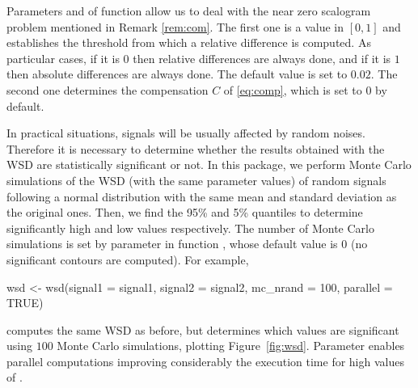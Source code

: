 Parameters  and  of function  allow us to deal with the near zero scalogram problem mentioned in Remark \ref{rem:com}. The first one is a value in $[0,1]$ and establishes the threshold from which a relative difference is computed. As particular cases, if it is $0$ then relative differences are always done, and if it is $1$ then absolute differences are always done. The default value is set to $0.02$. The second one determines the compensation $C$ of \eqref{eq:comp}, which is set to $0$ by default.

In practical situations, signals will be usually affected by random noises. Therefore it is necessary to determine whether the results obtained with the WSD are statistically significant or not.
In this package, we perform Monte Carlo simulations of the WSD (with the same parameter values) of random signals following a normal distribution with the same mean and standard deviation as the original ones. Then, we find the 95\% and 5\% quantiles to determine significantly high and low values respectively.
The number of Monte Carlo simulations is set by parameter  in function , whose default value is $0$ (no significant contours are computed). For example,
\begin{example}
wsd <- wsd(signal1 = signal1, signal2 = signal2,
           mc_nrand = 100, parallel = TRUE)
\end{example}
computes the same WSD as before, but determines which values are significant using $100$ Monte Carlo simulations, plotting Figure~\ref{fig:wsd}. Parameter  enables parallel computations improving considerably the execution time for high values of .

